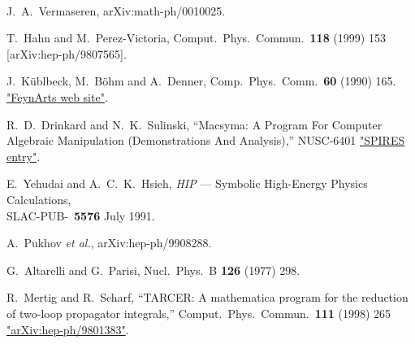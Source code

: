 
~\vspace{3cm}

\begin{thebibliography}{99}

J.~A.~Vermaseren,
arXiv:math-ph/0010025.

T.~Hahn and M.~Perez-Victoria,
Comput.\ Phys.\ Commun.\  {\bf 118} (1999) 153
[arXiv:hep-ph/9807565].


 J.~K\"ublbeck, M.~B\"ohm and A.~Denner,
Comp.~Phys.~Comm.~{\bf 60} (1990) 165.\\
\href{http://www.feynarts.de/}{"FeynArts web site"}.

R.~D.~Drinkard and N.~K.~Sulinski,
``Macsyma: A Program For Computer Algebraic Manipulation (Demonstrations And Analysis),''
NUSC-6401
\href{http://www.slac.stanford.edu/spires/find/hep/www?r=nusc-6401}{"SPIRES entry"}.

E.~Yehudai and A.~C.~K.~Hsieh,
{\sl HIP\/} --- Symbolic  High-Energy Physics Calculations, \\
SLAC-PUB-~{\bf 5576} July 1991.

A.~Pukhov {\it et al.},
arXiv:hep-ph/9908288.

G.~Altarelli and G.~Parisi,
Nucl.\ Phys.\ B {\bf 126} (1977) 298.

R.~Mertig and R.~Scharf,
``TARCER: A mathematica program for the reduction of two-loop propagator  integrals,''
Comput.\ Phys.\ Commun.\  {\bf 111} (1998) 265
\href{http://xxx.lanl.gov/abs/hep-ph/9801383}{"arXiv:hep-ph/9801383"}.


\end{thebibliography}

